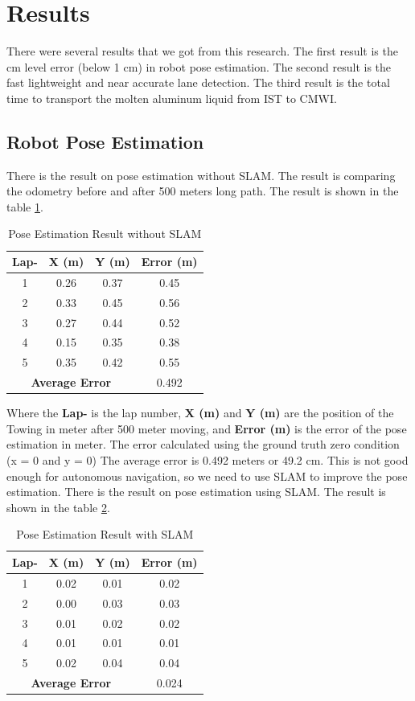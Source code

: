 \documentclass[conference]{IEEEtran}
\begin{document}
\section{Results} 
There were several results that we got from this research. The first result is the cm level error (below 1 cm) in robot pose estimation. The second result is the fast lightweight and near accurate lane detection. The third result is the total time to transport the molten aluminum liquid from IST to CMWI. 

\subsection{Robot Pose Estimation} 
There is the result on pose estimation without SLAM. The result is comparing the odometry before and after 500 meters long path. The result is shown in the table \ref{tab:pose_estimation}.
\begin{table}[H]
	\centering
	\caption{Pose Estimation Result without SLAM}
	\label{tab:pose_estimation}
	\begin{tabular}{|c|c|c|c|}
		\hline
		\textbf{Lap-} & \textbf{X (m)} & \textbf{Y (m)} & \textbf{Error (m)} \\ \hline
		1 & 0.26 & 0.37 & 0.45 \\ \hline
		2 & 0.33 & 0.45 & 0.56 \\ \hline
		3 & 0.27 & 0.44 & 0.52 \\ \hline
		4 & 0.15 & 0.35 & 0.38 \\ \hline
		5 & 0.35 & 0.42 & 0.55 \\ \hline
		\multicolumn{3}{|c|}{\textbf{Average Error}} & 0.492 \\ \hline
	\end{tabular}
\end{table}
Where the \textbf{Lap-} is the lap number, \textbf{X (m)} and \textbf{Y (m)} are the position of the Towing in meter after 500 meter moving, and \textbf{Error (m)} is the error of the pose estimation in meter. The error calculated using the ground truth zero condition (x = 0 and y = 0) The average error is 0.492 meters or 49.2 cm. This is not good enough for autonomous navigation, so we need to use SLAM to improve the pose estimation. There is the result on pose estimation using SLAM. The result is shown in the table \ref{tab:pose_estimation_slam}.
\begin{table}[H]
	\centering
	\caption{Pose Estimation Result with SLAM}
	\label{tab:pose_estimation_slam}
	\begin{tabular}{|c|c|c|c|}
		\hline
		\textbf{Lap-} & \textbf{X (m)} & \textbf{Y (m)} & \textbf{Error (m)} \\ \hline
		1 & 0.02 & 0.01 & 0.02 \\ \hline
		2 & 0.00 & 0.03 & 0.03 \\ \hline
		3 & 0.01 & 0.02 & 0.02 \\ \hline
		4 & 0.01 & 0.01 & 0.01 \\ \hline
		5 & 0.02 & 0.04 & 0.04 \\ \hline
		\multicolumn{3}{|c|}{\textbf{Average Error}} & 0.024 \\ \hline
	\end{tabular}
\end{table}
\end{document}
